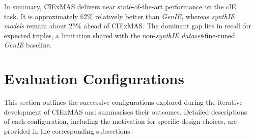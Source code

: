 \documentclass[a4paper,oneside,bibliography=totoc]{scrbook}
\begin{document}
In summary, CIExMAS delivers near state-of-the-art performance on the \ac{cIE} task. It is approximately 62\% relatively better than \textit{GenIE}, whereas \textit{synthIE models} remain about 25\% ahead of CIExMAS. The dominant gap lies in recall for expected triples, a limitation shared with the non-\textit{synthIE dataset}-fine-tuned \textit{GenIE} baseline.

\section{Evaluation Configurations}
\label{sec:evaluation_configurations}

This section outlines the successive configurations explored during the iterative development of CIExMAS and summarises their outcomes. Detailed descriptions of each configuration, including the motivation for specific design choices, are provided in the corresponding subsections.
\end{document}
